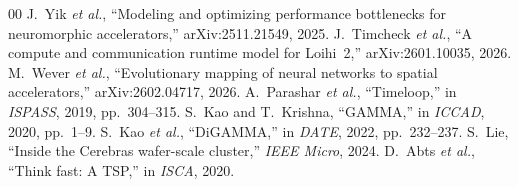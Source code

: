\documentclass[conference]{IEEEtran}
\begin{document}
\begin{thebibliography}{00}
 J.~Yik \textit{et al.}, ``Modeling and optimizing performance bottlenecks for neuromorphic accelerators,'' arXiv:2511.21549, 2025.
 J.~Timcheck \textit{et al.}, ``A compute and communication runtime model for Loihi~2,'' arXiv:2601.10035, 2026.
 M.~Wever \textit{et al.}, ``Evolutionary mapping of neural networks to spatial accelerators,'' arXiv:2602.04717, 2026.
 A.~Parashar \textit{et al.}, ``Timeloop,'' in \textit{ISPASS}, 2019, pp.~304--315.
 S.~Kao and T.~Krishna, ``GAMMA,'' in \textit{ICCAD}, 2020, pp.~1--9.
 S.~Kao \textit{et al.}, ``DiGAMMA,'' in \textit{DATE}, 2022, pp.~232--237.
 S.~Lie, ``Inside the Cerebras wafer-scale cluster,'' \textit{IEEE Micro}, 2024.
 D.~Abts \textit{et al.}, ``Think fast: A TSP,'' in \textit{ISCA}, 2020.
\end{thebibliography}

\balance
\end{document}
